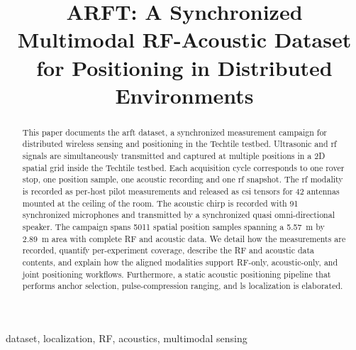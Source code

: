 \documentclass[conference]{IEEEtran}
\begin{document}
\title{ARFT: A Synchronized Multimodal RF-Acoustic Dataset for Positioning in Distributed Environments}


\author{
}

\maketitle

\begin{abstract}
This paper documents the \gls{arft} dataset, a synchronized measurement campaign for distributed wireless sensing and positioning in the Techtile testbed. Ultrasonic and \gls{rf} signals are simultaneously transmitted and captured at multiple positions in a 2D spatial grid inside the Techtile testbed.
Each acquisition cycle corresponds to one rover stop, one position sample, one acoustic recording and one \gls{rf} snapshot. The \gls{rf} modality is recorded as per-host pilot measurements and released as \gls{csi} tensors for 42 antennas mounted at the ceiling of the room. The acoustic chirp is recorded with 91 synchronized microphones and transmitted by a synchronized quasi omni-directional speaker. The campaign spans 5011 spatial position samples spanning  a 5.57~m by 2.89~m area with complete RF and acoustic data. We detail how the measurements are recorded, quantify per-experiment coverage, describe the RF and acoustic data contents, and explain how the aligned modalities support RF-only, acoustic-only, and joint positioning workflows. Furthermore, a static acoustic positioning pipeline that performs anchor selection, pulse-compression ranging, and \gls{ls} localization is elaborated. 
\end{abstract}

\begin{IEEEkeywords}
dataset, localization, RF, acoustics, multimodal sensing
\end{IEEEkeywords}
\end{document}
